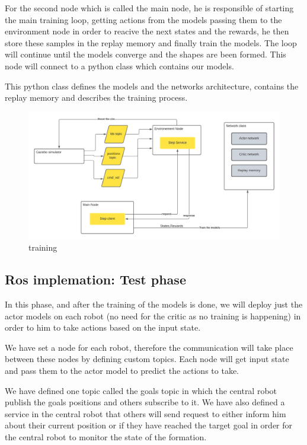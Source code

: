\documentclass[12pt]{extarticle}
\begin{document}
For the second node which is called  the main node, he is responsible of starting the main training loop, getting actions from the models passing them to the environment node in order to reacive the next states and the rewards, he then store these samples in the replay memory and finally train the models.
The loop will continue until the models converge and the shapes are been formed. This node will connect to a python class which contains our models.


This python class defines the models and the networks architecture, contains the replay memory and describes the training process.  



 \begin{figure}[h]  
\centering
\includegraphics[scale=0.6]{training}
\caption[training phase]{training}
\end{figure}

\pagebreak

\subsection{Ros implemation: Test phase}
In this phase, and after the training of the models is done, we will deploy  just the actor models on each robot (no need for the critic as no training is happening)  in order to him to take actions based on the input state.

We have set a node for each robot, therefore the communication will take place  between these nodes by defining custom topics. Each node will get input state and pass them to the actor model to predict the actions to take.

We have defined one topic called the goals topic in which the central robot  publish the goals positions and  others subscribe to it. We have also defined a service in the central robot that  others will send request to  either  inform him about their current position  or if they have reached the target goal in order for the central robot to monitor the state of the formation.
\end{document}
